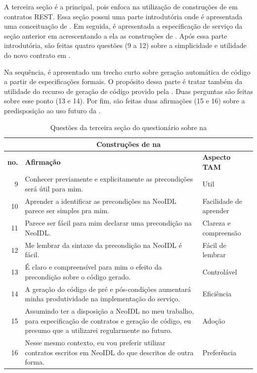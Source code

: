 A terceira seção é a principal, pois enfoca na utilização de construções de
\designbycontract{} em contratos REST. Essa seção possui uma parte introdutória
onde é apresentada uma conceituação de \designbycontract{}. Em seguida, é
apresentada a especificação de serviço da seção anterior em \neoidl{}
acrescentando a ela	 as construções de \designbycontract{}. Após essa parte
introdutória, são feitas quatro questões (9 a 12) sobre a simplicidade e
utilidade do novo contrato em \neoidl{}.

Na sequência, é apresentado um trecho curto sobre geração automática de código a
partir de especificações formais. O propósito dessa parte é tratar também da
utilidade do recurso de geração de código provido pela \neoidl{}. Duas perguntas
são feitas sobre esse ponto (13 e 14). Por fim, são feitas duas afirmações (15
e 16) sobre a predisposição ao uso futuro da \neoidl{}.


\begin{table}[h]
\scriptsize
\centering
\vspace{0.5cm}
\begin{tabular}{r|p{10cm}|p{3cm}}
\multicolumn{3}{c}{{\normalsize Construções de \designbycontract{} na \neoidl{}}}\\

\hline    
\textbf{no.} &  \textbf{Afirmação} & \textbf{Aspecto TAM} \\
\hline    
9 & Conhecer previamente e explicitamente as precondições será útil para mim. &
Util \\
10 & Aprender a identificar as precondições na NeoIDL parece ser simples pra
mim. & Facilidade de aprender \\
11 & Parece ser fácil para mim declarar uma precondição na NeoIDL. & Clareza e compreensão \\
12 & Me lembrar da sintaxe da precondição na NeoIDL é fácil. & Fácil de
lembrar \\
\hline 
13 & É claro e compreensível para mim o efeito da precondição sobre o código
gerado. & Controlável \\
14 & A geração do código de pré e pós-condições aumentará minha produtividade na
implementação do serviço. & Eficiência \\
\hline  
15 & Assumindo ter a disposição a NeoIDL no meu trabalho, para especificação de
contratos e geração de código, eu presumo que a utilizarei regularmente no
futuro. & Adoção \\
16 & Nesse mesmo contexto, eu vou preferir utilizar contratos escritos em NeoIDL
do que descritos de outra forma. & Preferência \\
\end{tabular}
\caption{Questões da terceira seção do questionário sobre \designbycontract{}
na \neoidl{}}
\label{Secao3Questionario}
\end{table}


